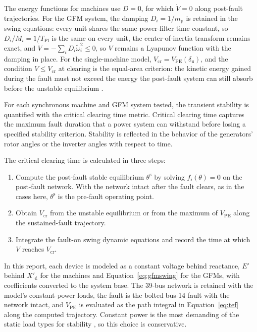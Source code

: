 \documentclass[11pt]{article}
\begin{document}
The energy functions for machines use $D=0$, for which $\dot V=0$ along post-fault trajectories. For the GFM system, the damping $D_i=1/m_{\mathrm{p}}$ is retained in the swing equations: every unit shares the same power-filter time constant, so $D_i/M_i=1/T_{\mathrm{Pf}}$ is the same on every unit, the center-of-inertia transform remains exact, and $\dot V=-\sum_i D_i\tilde\omega_i^2\le 0$, so $V$ remains a Lyapunov function with the damping in place. For the single-machine model, $V_{\mathrm{cr}}=V_{\mathrm{PE}}(\delta_{\mathrm{u}})$, and the condition $V\le V_{\mathrm{cr}}$ at clearing is the equal-area criterion: the kinetic energy gained during the fault must not exceed the energy the post-fault system can still absorb before the unstable equilibrium \cite[Sec.~9.6.3]{sauer1998}.

For each synchronous machine and GFM system tested, the transient stability is quantified with the critical clearing time metric. Critical clearing time captures the maximum fault duration that a power system can withstand before losing a specified stability criterion. Stability is reflected in the behavior of the generators' rotor angles or the inverter angles with respect to time. 

The critical clearing time is calculated in three steps:
\begin{enumerate}
\item Compute the post-fault stable equilibrium $\theta^{\mathrm{s}}$ by solving $f_i(\theta)=0$ on the post-fault network. With the network intact after the fault clears, as in the cases here, $\theta^{\mathrm{s}}$ is the pre-fault operating point.
\item Obtain $V_{\mathrm{cr}}$ from the unstable equilibrium or from the maximum of $V_{\mathrm{PE}}$ along the sustained-fault trajectory.
\item Integrate the fault-on swing dynamic equations and record the time at which $V$ reaches $V_{\mathrm{cr}}$.
\end{enumerate}
In this report, each device is modeled as a constant voltage behind reactance, $E'$ behind $X'_{\mathrm{d}}$ for the machines and Equation~\eqref{eq:gfmswing} for the GFMs, with coefficients converted to the system base. The 39-bus network is retained with the model's constant-power loads, the fault is the bolted bus-14 fault with the network intact, and $V_{\mathrm{PE}}$ is evaluated as the path integral in Equation~\eqref{eq:tef} along the computed trajectory. Constant power is the most demanding of the static load types for stability \cite[Sec.~8.4.3]{sauer1998}, so this choice is conservative. 
\end{document}

